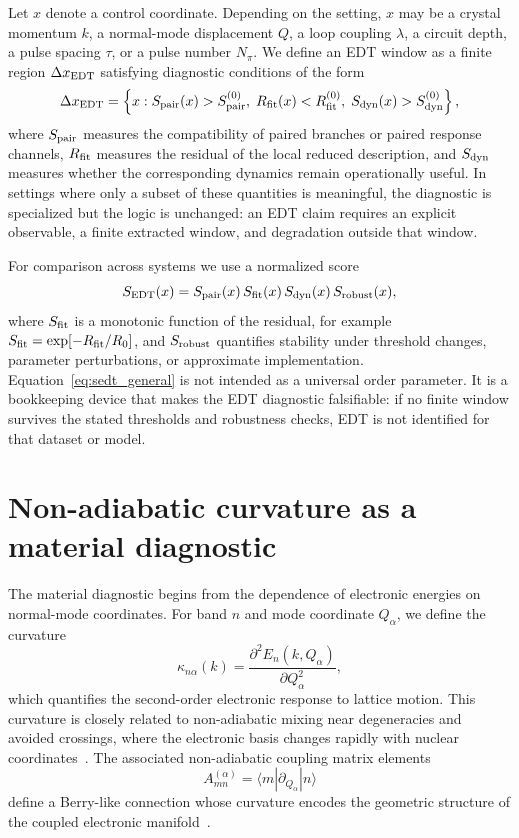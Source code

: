\documentclass[
  prx,
  reprint,
  superscriptaddress,
  amsmath,
  amssymb,
  aps
]{revtex4-2}
\begin{document}
Let $x$ denote a control coordinate. Depending on the setting, $x$ may be a crystal momentum $k$, a normal-mode displacement $Q$, a loop coupling $\lambda$, a circuit depth, a pulse spacing $\tau$, or a pulse number $N_\pi$. We define an EDT window as a finite region $\Delta x_{\rm EDT}$ satisfying diagnostic conditions of the form
\begin{equation}
\Delta x_{\rm EDT}
=
\left\{x:
S_{\rm pair}(x)>S_{\rm pair}^{(0)},\;
R_{\rm fit}(x)<R_{\rm fit}^{(0)},\;
S_{\rm dyn}(x)>S_{\rm dyn}^{(0)}
\right\},
\label{eq:edt_window_general}
\end{equation}
where $S_{\rm pair}$ measures the compatibility of paired branches or paired response channels, $R_{\rm fit}$ measures the residual of the local reduced description, and $S_{\rm dyn}$ measures whether the corresponding dynamics remain operationally useful. In settings where only a subset of these quantities is meaningful, the diagnostic is specialized but the logic is unchanged: an EDT claim requires an explicit observable, a finite extracted window, and degradation outside that window.

For comparison across systems we use a normalized score
\begin{equation}
S_{\rm EDT}(x)
=
S_{\rm pair}(x)\,S_{\rm fit}(x)\,S_{\rm dyn}(x)\,S_{\rm robust}(x),
\label{eq:sedt_general}
\end{equation}
where $S_{\rm fit}$ is a monotonic function of the residual, for example $S_{\rm fit}=\exp[-R_{\rm fit}/R_0]$, and $S_{\rm robust}$ quantifies stability under threshold changes, parameter perturbations, or approximate implementation. Equation~\eqref{eq:sedt_general} is not intended as a universal order parameter. It is a bookkeeping device that makes the EDT diagnostic falsifiable: if no finite window survives the stated thresholds and robustness checks, EDT is not identified for that dataset or model.

\section{Non-adiabatic curvature as a material diagnostic}

The material diagnostic begins from the dependence of electronic energies on normal-mode coordinates. For band $n$ and mode coordinate $Q_\alpha$, we define the curvature
\begin{equation}
\kappa_{n\alpha}(k)
=
\frac{\partial^2 E_n(k,Q_\alpha)}{\partial Q_\alpha^2},
\label{eq:kappa_definition}
\end{equation}
which quantifies the second-order electronic response to lattice motion. This curvature is closely related to non-adiabatic mixing near degeneracies and avoided crossings, where the electronic basis changes rapidly with nuclear coordinates~\cite{BornOppenheimer1927,Mead1979,Yarkony1996}. The associated non-adiabatic coupling matrix elements
\begin{equation}
A^{(\alpha)}_{mn}=\langle m|\partial_{Q_\alpha}|n\rangle
\label{eq:nact}
\end{equation}
define a Berry-like connection whose curvature encodes the geometric structure of the coupled electronic manifold~\cite{Berry1984,Xiao2010}.
\end{document}
